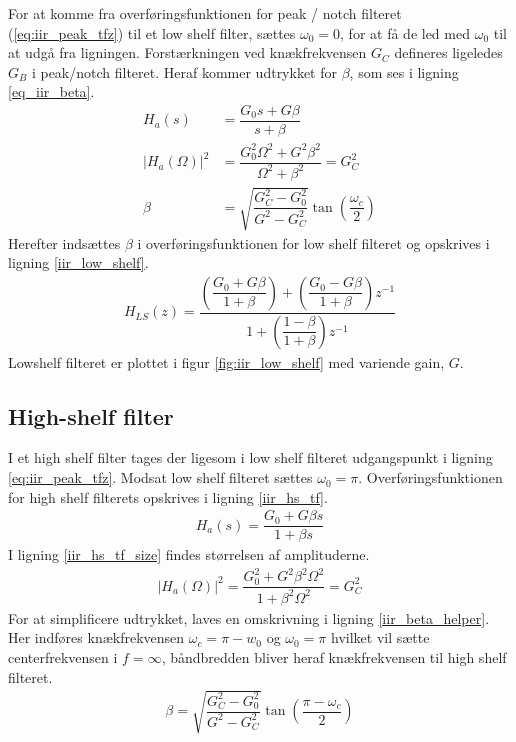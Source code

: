 	For at komme fra overføringsfunktionen for peak / notch filteret (\ref{eq:iir_peak_tfz}) til et low shelf filter, sættes $\omega_0 = 0$, for at få de led med $\omega_0$ til at udgå fra ligningen. 
	Forstærkningen ved knækfrekvensen $G_C$ defineres ligeledes $G_B$ i peak/notch filteret.
    Heraf kommer udtrykket for $\beta$, som ses i ligning \ref{eq_iir_beta}.
    \begin{align}
        H_a (s) &= \dfrac{G_0 s + G \beta}{s + \beta} \nonumber \\
        |H_a (\Omega)|^2 &= \dfrac{G_0^2 \Omega^2 + G^2 \beta^2}{\Omega^2 + \beta^2} = G_C^2 \nonumber \\
        \beta &= \sqrt{\dfrac{G_C^2 - G_0^2}{G^2 - G_C^2}} \tan \left( \dfrac{\omega_c}{2} \right) \label{eq_iir_beta}
    \end{align}
	Herefter indsættes $\beta$ i overføringsfunktionen for low shelf filteret og opskrives i ligning \ref{iir_low_shelf}.
     \begin{align}
      H_{LS}(z) =   \dfrac{\left(\dfrac{G_0 + G \beta}{1 + \beta} \right)+ \left(\dfrac{ G_0 - G \beta}{1 + \beta }\right) z^{-1}}{1 + \left( \dfrac{1 - \beta}{1 + \beta} \right) z^{-1}} \label{iir_low_shelf}
     \end{align}
	Lowshelf filteret er plottet i figur \ref{fig:iir_low_shelf} med variende gain, $G$.
   
   
     \subsection{High-shelf filter}
	I et high shelf filter tages der ligesom i low shelf filteret udgangspunkt i ligning \ref{eq:iir_peak_tfz}. Modsat low shelf filteret sættes $\omega_0 = \pi$.
	Overføringsfunktionen for high shelf filterets opskrives i ligning \ref{iir_hs_tf}.
     \begin{align}
        H_a (s) = \dfrac{G_0 + G \beta s}{1 + \beta s} \label{iir_hs_tf}
     \end{align}
	I ligning \ref{iir_hs_tf_size} findes størrelsen af amplituderne.
     \begin{align}
         |H_a(\Omega)|^2 = \dfrac{G_0^2 + G^2 \beta^2 \Omega^2}{1 + \beta^2 \Omega^2} = G_C^2 \label{iir_hs_tf_size}
     \end{align}
     For at simplificere udtrykket, laves en omskrivning i ligning \ref{iir_beta_helper}. Her indføres knækfrekvensen $\omega_c = \pi - w_0$ og $\omega_0 = \pi$ hvilket vil sætte centerfrekvensen i $f = \infty$, båndbredden bliver heraf knækfrekvensen til high shelf filteret.
    \begin{align}
        \beta = \sqrt{\dfrac{G_C^2 - G_0^2}{G^2 - G_C^2}} \tan \left( \dfrac{\pi - \omega_c}{2} \right) \label{iir_beta_helper}
    \end{align}

